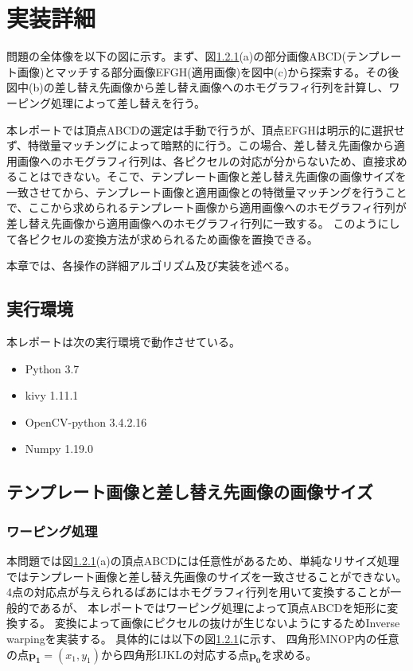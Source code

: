 \section{実装詳細}
問題の全体像を以下の図に示す。まず、図\ref{}(a)の部分画像ABCD(テンプレート画像)とマッチする部分画像EFGH(適用画像)を図中(c)から探索する。その後図中(b)の差し替え先画像から差し替え画像へのホモグラフィ行列を計算し、ワーピング処理によって差し替えを行う。

本レポートでは頂点ABCDの選定は手動で行うが、頂点EFGHは明示的に選択せず、特徴量マッチングによって暗黙的に行う。この場合、差し替え先画像から適用画像へのホモグラフィ行列は、各ピクセルの対応が分からないため、直接求めることはできない。そこで、テンプレート画像と差し替え先画像の画像サイズを一致させてから、テンプレート画像と適用画像との特徴量マッチングを行うことで、ここから求められるテンプレート画像から適用画像へのホモグラフィ行列が差し替え先画像から適用画像へのホモグラフィ行列に一致する。
このようにして各ピクセルの変換方法が求められるため画像を置換できる。

本章では、各操作の詳細アルゴリズム及び実装を述べる。

\subsection{実行環境}
本レポートは次の実行環境で動作させている。
\begin{itemize}
    \item Python 3.7
    \item kivy 1.11.1
    \item OpenCV-python 3.4.2.16
    \item Numpy 1.19.0
\end{itemize}

\subsection{テンプレート画像と差し替え先画像の画像サイズ}
\subsubsection{ワーピング処理}
本問題では図\ref{}(a)の頂点ABCDには任意性があるため、単純なリサイズ処理ではテンプレート画像と差し替え先画像のサイズを一致させることができない。
4点の対応点が与えられるばあにはホモグラフィ行列を用いて変換することが一般的であるが、
本レポートではワーピング処理によって頂点ABCDを矩形に変換する。
変換によって画像にピクセルの抜けが生じないようにするためInverse warpingを実装する。
具体的には以下の図\ref{}に示す、
四角形MNOP内の任意の点$\bm{p_1}=(x_1, y_1)$から四角形IJKLの対応する点$\bm{p_0}$を求める。

